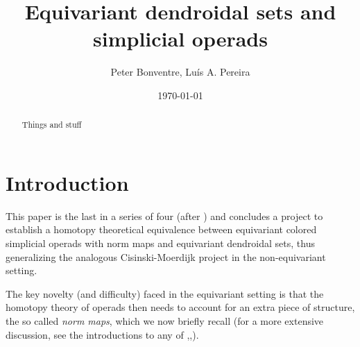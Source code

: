 \documentclass[a4paper,10pt
,draft
]{article}%
\title{Equivariant dendroidal sets and simplicial operads}
\author{Peter Bonventre, Lu\'is A. Pereira}%
\date{\today}
\numberwithin{equation}{section}
\numberwithin{figure}{section}
\theoremstyle{definition} %
\newcommand{\1}{\ensuremath{\mathbbm 1}}%
\begin{document}
\maketitle

\begin{abstract}
      Things and stuff
\end{abstract}

\tableofcontents


\section{Introduction}

This paper is the last in a series of four
(after \cite{Per18,BP_edss,BP_HGOP})
and concludes a project to establish a homotopy theoretical equivalence
between equivariant colored simplicial operads with norm maps
and equivariant dendroidal sets,
thus generalizing the analogous 
Cisinski-Moerdijk project 
\cite{CM13a,CM13b,CM11}
in the non-equivariant setting.

The key novelty (and difficulty) faced in the equivariant setting is that the homotopy theory of operads
then needs to account for an 
extra piece of structure,
the so called \emph{norm maps},
which we now briefly recall
(for a more extensive discussion, 
see the introductions to any of
\cite{Per18},\cite{BP_geo},\cite{BP_HGOP}).
\end{document}
